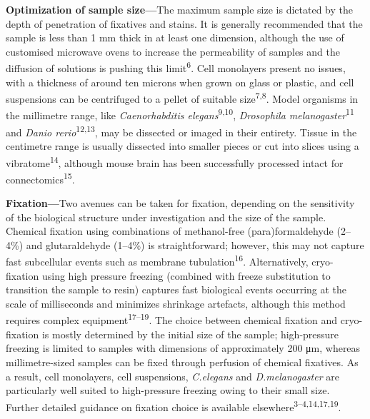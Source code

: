\documentclass{article}
\begin{document}
\textbf{Optimization of sample size—}The maximum sample size is dictated by the depth of penetration of fixatives and stains. It is generally recommended that the sample is less than 1 mm thick in at least one dimension, although the use of customised microwave ovens to increase the permeability of samples and the diffusion of solutions is pushing this limit\textsuperscript{6}. Cell monolayers present no issues, with a thickness of around ten microns when grown on glass or plastic, and cell suspensions can be centrifuged to a pellet of suitable size\textsuperscript{7,8}. Model organisms in the millimetre range, like \emph{Caenorhabditis elegans}\textsuperscript{9,10}, \emph{Drosophila melanogaster}\textsuperscript{11} and \emph{Danio rerio}\textsuperscript{12,13}, may be dissected or imaged in their entirety. Tissue in the centimetre range is usually dissected into smaller pieces or cut into slices using a vibratome\textsuperscript{14}, although mouse brain has been successfully processed intact for connectomics\textsuperscript{15}.

\textbf{Fixation—}Two avenues can be taken for fixation, depending on the sensitivity of the biological structure under investigation and the size of the sample. Chemical fixation using combinations of methanol-free (para)formaldehyde (2–4\%) and glutaraldehyde (1–4\%) is straightforward; however, this may not capture fast subcellular events such as membrane tubulation\textsuperscript{16}. Alternatively, cryo-fixation using high pressure freezing (combined with freeze substitution to transition the sample to resin) captures fast biological events occurring at the scale of milliseconds and minimizes shrinkage artefacts, although this method requires complex equipment\textsuperscript{17–19}. The choice between chemical fixation and cryo-fixation is mostly determined by the initial size of the sample; high-pressure freezing is limited to samples with dimensions of approximately 200 μm, whereas millimetre-sized samples can be fixed through perfusion of chemical fixatives. As a result, cell monolayers, cell suspensions, \emph{C.elegans} and \emph{D.melanogaster} are particularly well suited to high-pressure freezing owing to their small size. Further detailed guidance on fixation choice is available elsewhere\textsuperscript{3–4,14,17,19}.
\end{document}
